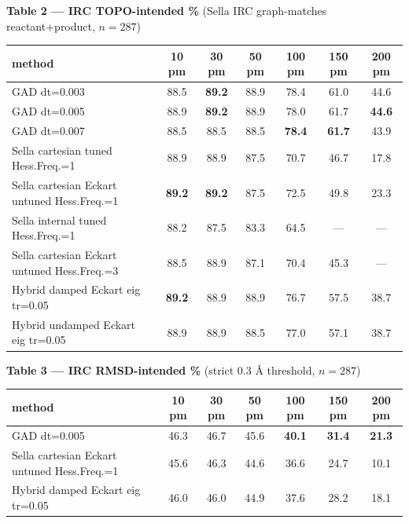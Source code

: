\documentclass[11pt]{article}
\begin{document}
\begin{center}\footnotesize
\textbf{Table 2 — IRC TOPO-intended \%} (Sella IRC graph-matches reactant+product, $n=287$)\\[0.3em]
\begin{tabular}{l|cccccc}
\toprule
\textbf{method} & \textbf{10 pm} & \textbf{30 pm} & \textbf{50 pm} & \textbf{100 pm} & \textbf{150 pm} & \textbf{200 pm} \\
\midrule
GAD dt=0.003                       & 88.5 & \textbf{89.2} & 88.9 & 78.4 & 61.0 & 44.6 \\
GAD dt=0.005                       & 88.9 & \textbf{89.2} & 88.9 & 78.0 & 61.7 & \textbf{44.6} \\
GAD dt=0.007                       & 88.5 & 88.5 & 88.5 & \textbf{78.4} & \textbf{61.7} & 43.9 \\
\midrule
Sella cartesian tuned Hess.Freq.=1          & 88.9 & 88.9 & 87.5 & 70.7 & 46.7 & 17.8 \\
Sella cartesian Eckart untuned Hess.Freq.=1 & \textbf{89.2} & \textbf{89.2} & 87.5 & 72.5 & 49.8 & 23.3 \\
Sella internal tuned Hess.Freq.=1           & 88.2 & 87.5 & 83.3 & 64.5 & ---  & ---  \\
Sella cartesian Eckart untuned Hess.Freq.=3 & 88.5 & 88.9 & 87.1 & 70.4 & 45.3 & ---  \\
\midrule
Hybrid damped Eckart eig tr=0.05   & \textbf{89.2} & 88.9 & 88.9 & 76.7 & 57.5 & 38.7 \\
Hybrid undamped Eckart eig tr=0.05 & 88.9 & 88.9 & 88.5 & 77.0 & 57.1 & 38.7 \\
\bottomrule
\end{tabular}
\end{center}

\begin{center}\footnotesize
\textbf{Table 3 — IRC RMSD-intended \%} (strict 0.3 Å threshold, $n=287$)\\[0.3em]
\begin{tabular}{l|cccccc}
\toprule
\textbf{method} & \textbf{10 pm} & \textbf{30 pm} & \textbf{50 pm} & \textbf{100 pm} & \textbf{150 pm} & \textbf{200 pm} \\
\midrule
GAD dt=0.005                       & 46.3 & 46.7 & 45.6 & \textbf{40.1} & \textbf{31.4} & \textbf{21.3} \\
Sella cartesian Eckart untuned Hess.Freq.=1 & 45.6 & 46.3 & 44.6 & 36.6 & 24.7 & 10.1 \\
Hybrid damped Eckart eig tr=0.05   & 46.0 & 46.0 & 44.9 & 37.6 & 28.2 & 18.1 \\
\bottomrule
\end{tabular}
\end{center}
\end{document}
